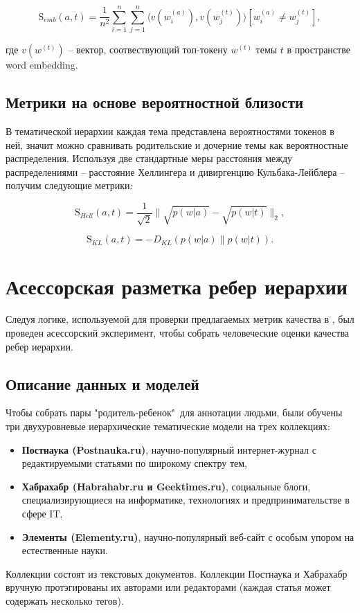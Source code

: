 $$\mathrm{S}_{emb}(a, t) = \dfrac{1}{n^2}\sum\limits_{i=1}^n \sum\limits_{j=1}^n \langle v(w^{(a)}_i), v(w^{(t)}_j)\rangle[w_i^{(a)} \neq w_j^{(t)}],$$ 

где $v(w^{(t)})$ -- вектор, соотвествующий топ-токену $w^{(t)}$ темы $t$ в пространстве word embedding.

\subsection{Метрики на основе вероятностной близости}
В тематической иерархии каждая тема представлена вероятностями токенов в ней, значит можно сравнивать родительские и дочерние темы как вероятностные распределения. Используя две стандартные меры расстояния между распределениями -- расстояние Хеллингера и дивиргенцию Кульбака-Лейблера -- получим следующие метрики:

$$ \mathrm{S}_{Hell}(a, t) = \dfrac{1}{\sqrt{2}} \| \sqrt{p(w|a)} - \sqrt{p(w|t)}\|_2,$$

$$\mathrm{S}_{KL}(a, t) = -D_{KL}(p(w|a)\|p(w|t)).$$

\section{Асессорская разметка ребер иерархии}
Следуя логике, используемой для проверки предлагаемых метрик качества в \cite{Mimno2011, Nikolenko2016}, был проведен асессорский эксперимент, чтобы собрать человеческие оценки качества ребер иерархии.

\subsection{Описание данных и моделей}
Чтобы собрать пары "родитель-ребенок"\ для аннотации людьми, были обучены три двухуровневые иерархические тематические модели на трех коллекциях:
\begin{itemize}
\item \textbf{Постнаука (Postnauka.ru)}, научно-популярный интернет-журнал с редактируемыми статьями по широкому спектру тем,
\item \textbf{Хабрахабр (Habrahabr.ru и Geektimes.ru)}, социальные блоги, специализирующиеся на информатике, технологиях и предпринимательстве в сфере IT,
\item \textbf{Элементы (Elementy.ru)}, научно-популярный веб-сайт с особым упором на естественные науки.
\end{itemize}

Коллекции состоят из текстовых документов. Коллекции Постнаука и Хабрахабр вручную протэгированы их авторами или редакторами (каждая статья может содержать несколько тегов).

